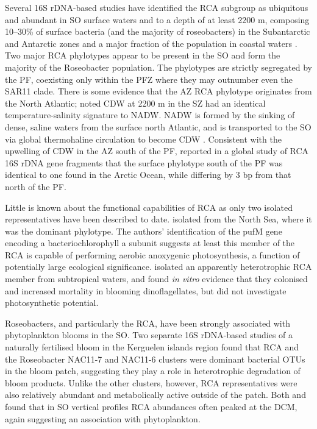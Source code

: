 Several 16S rDNA-based studies have identified the \ac{RCA} subgroup as ubiquitous and abundant in \ac{SO} surface waters and to a depth of at least 2200 m, composing \textapprox{}10--30\% of surface bacteria (and the majority of roseobacters) in the Subantarctic and Antarctic zones \cite{Giebel:2009hr,Murray:2007db,Ghiglione:2011ee} and a major fraction of the population in coastal waters \cite{Murray:2007db,Koh:2011ij}.
Two major \ac{RCA} phylotypes appear to be present in the \ac{SO} and form the majority of the Roseobacter population.
The phylotypes are strictly segregated by the \ac{PF}, coexisting only within the \ac{PFZ} \cite{Selje:2004ka,Giebel:2009hr} where they may outnumber even the SAR11 clade.
There is some evidence that the \ac{AZ} \ac{RCA} phylotype originates from the North Atlantic; \citet{Giebel:2009hr} noted \ac{CDW} at 2200 m in the \ac{SZ} had an identical temperature-salinity signature to \ac{NADW}.
\ac{NADW} is formed by the sinking of dense, saline waters from the surface north Atlantic, and is transported to the \ac{SO} via global thermohaline circulation to become \ac{CDW} \cite{Callahan:1972tk}.
Consistent with the upwelling of \ac{CDW} in the \ac{AZ} south of the \ac{PF}, \citep{Selje:2004ka} reported in a global study of \ac{RCA} 16S rDNA gene fragments that the surface phylotype south of the \ac{PF} was identical to one found in the Arctic Ocean, while differing by 3 bp from that north of the \ac{PF}.

Little is known about the functional capabilities of \ac{RCA} as only two isolated representatives have been described to date.
\citep{Giebel:2010bsa} isolated  from the North Sea, where it was the dominant phylotype.
The authors' identification of the pufM gene encoding a bacteriochlorophyll a subunit suggests at least this member of the \ac{RCA} is capable of performing aerobic anoxygenic photosynthesis, a function of potentially large ecological significance.
\citet{Mayali:2008eb} isolated an apparently heterotrophic \ac{RCA} member from subtropical waters, and found \emph{in vitro} evidence that they colonised and increased mortality in blooming dinoflagellates, but did not investigate photosynthetic potential.

Roseobacters, and particularly the \ac{RCA}, have been strongly associated with phytoplankton blooms in the \ac{SO}.
Two separate 16S rDNA-based studies of a naturally fertilised bloom in the Kerguelen islands region \cite{West:2008kc,Obernosterer:2011df} found that \ac{RCA} and the Roseobacter NAC11-7 and NAC11-6 clusters were dominant bacterial \acp{OTU} in the bloom patch, suggesting they play a role in heterotrophic degradation of bloom products.
Unlike the other clusters, however, \ac{RCA} representatives were also relatively abundant and metabolically active outside of the patch.
Both \citet{Giebel:2009hr} and \citet{Obernosterer:2011df} found that in \ac{SO} vertical profiles \ac{RCA} abundances often peaked at the \ac{DCM}, again suggesting an association with phytoplankton.


